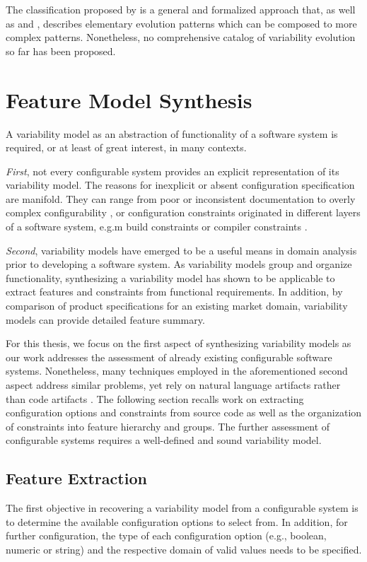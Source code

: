 The classification proposed by \cite{peng_analyzing_2011} is a general and formalized approach
that, as well as \cite{seidl_co-evolution_2012} and \cite{passos_towards_2012}, describes
elementary evolution patterns which can be composed to more complex patterns. Nonetheless, no
comprehensive catalog of variability evolution so far has been proposed.

\section{Feature Model Synthesis}  \label{sec:2.3}
A variability model as an abstraction of functionality of a software system is
required, or at least of great interest, in many contexts. 

\emph{First}, not
every configurable system provides an explicit
representation of its variability model. 
The reasons for inexplicit or absent configuration specification are manifold.
They can range from poor or inconsistent documentation
\citep{rabkin_static_2011} to overly complex configurability
\citep{xu_hey_2015}, or configuration constraints originated in different layers of a software
system, e.g.m build constraints  or compiler constraints \citep{nadi_where_2015}. 

\emph{Second}, variability models have emerged to be a useful means in domain
analysis prior to developing a software system. {\color{blue}As variability
models group and organize functionality, synthesizing a variability model has shown to be
applicable to extract features and constraints from functional requirements. 
In addition, by comparison of product specifications for an
existing market domain, variability models can provide detailed feature
summary.}

For this thesis, we focus on the first aspect of synthesizing variability
models as our work addresses the assessment of already existing configurable
software systems. Nonetheless, many techniques employed in the aforementioned
second aspect address similar problems, yet rely on natural language artifacts
rather than code artifacts \citep{alves_exploratory_2008,bakar_feature_2015}.
The following section recalls work on extracting configuration options and
constraints from source code as well as the organization of constraints into
feature hierarchy and groups. The further assessment of configurable systems
requires a well-defined and sound variability model.

\subsection{Feature Extraction} 
The first objective in recovering a variability model from a configurable
system is to determine the available configuration options to select
from. In addition, for further configuration, the type of each configuration
option (e.g., boolean, numeric or string) and the respective domain of valid values
needs to be specified.

